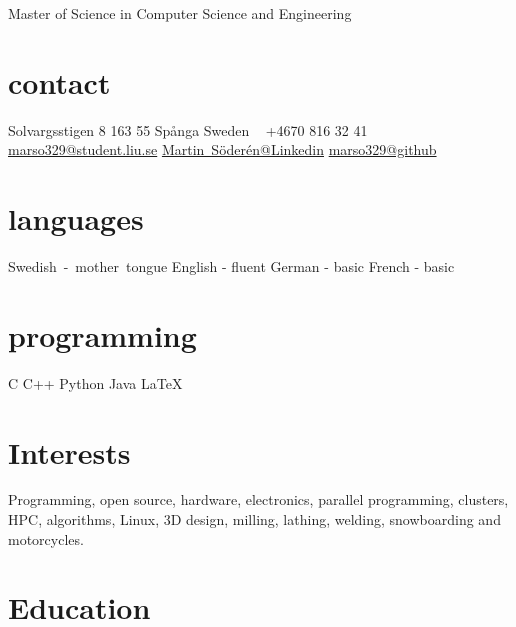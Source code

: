 \documentclass[]{cv-style}          %
\begin{document}
       {Master of Science in Computer Science and Engineering}        %


\begin{aside}
%
\section{contact}
Solvargsstigen 8
163 55 Spånga
Sweden
~
+4670 816 32 41
    ~
    \href{mailto:marso329@student.liu.se}{marso329@student.liu.se}
    \href{https://se.linkedin.com/in/martin-s%C3%B6der%C3%A9n-272002a7}{\mbox{Martin Söderén@Linkedin}}
        \href{https://github.com/marso329}{\mbox{marso329@github}}
\section{languages}
    \mbox{Swedish - mother tongue}
    English - fluent
    German - basic
    French - basic
\section{programming}
C
C++
Python
Java
\LaTeX{}
%
\end{aside}


\section{Interests}
  \vspace{-0.2cm}
Programming, open source, hardware, electronics, parallel programming, clusters, HPC, algorithms, Linux, 3D design, milling, lathing, welding, snowboarding and motorcycles. 


\section{Education}
\end{document}
